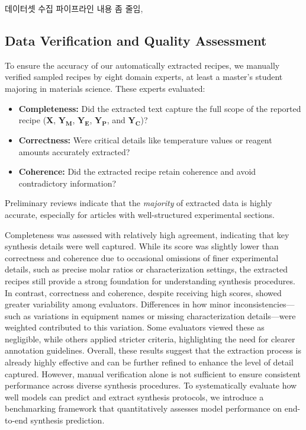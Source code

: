 {\color{red} 데이터셋 수집 파이프라인 내용 좀 줄임,}

\subsection{Data Verification and Quality Assessment}
To ensure the accuracy of our automatically extracted recipes, we manually verified sampled recipes by eight domain experts, at least a master's student majoring in materials science. These experts evaluated:

\begin{itemize}
    \item \textbf{Completeness:} Did the extracted text capture the full scope of the reported recipe (\textbf{X}, \(\mathbf{Y_M}\), \(\mathbf{Y_E}\), \(\mathbf{Y_P}\), and \(\mathbf{Y_C}\))?
    \item \textbf{Correctness:} Were critical details like temperature values or reagent amounts accurately extracted?
    \item \textbf{Coherence:} Did the extracted recipe retain coherence and avoid contradictory information?
\end{itemize}


Preliminary reviews indicate that the \emph{majority} of extracted data is highly accurate, especially for articles with well-structured experimental sections. 

Completeness was assessed with relatively high agreement, indicating that key synthesis details were well captured. While its score was slightly lower than correctness and coherence due to occasional omissions of finer experimental details, such as precise molar ratios or characterization settings, the extracted recipes still provide a strong foundation for understanding synthesis procedures. In contrast, correctness and coherence, despite receiving high scores, showed greater variability among evaluators. Differences in how minor inconsistencies—such as variations in equipment names or missing characterization details—were weighted contributed to this variation. Some evaluators viewed these as negligible, while others applied stricter criteria, highlighting the need for clearer annotation guidelines. Overall, these results suggest that the extraction process is already highly effective and can be further refined to enhance the level of detail captured.  
However, manual verification alone is not sufficient to ensure consistent performance across diverse synthesis procedures.  
To systematically evaluate how well models can predict and extract synthesis protocols, we introduce a benchmarking framework that quantitatively assesses model performance on end-to-end synthesis prediction.  

